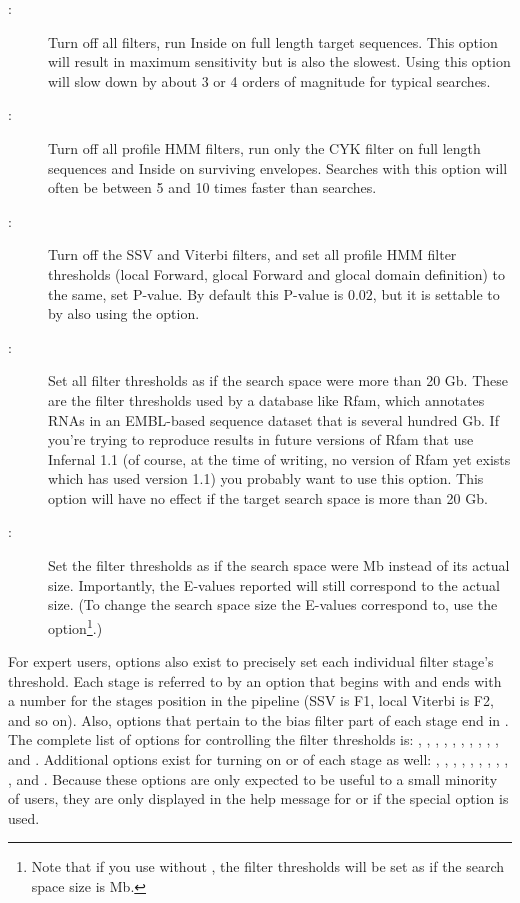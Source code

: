 \begin{description}
\item[:] Turn off all filters, run Inside on full length
  target sequences. This option will result in maximum sensitivity but
  is also the slowest. Using this option will slow down
   by about 3 or 4 orders of magnitude for typical
  searches.
\item[:] Turn off all profile HMM filters, run only the
  CYK filter on full length sequences and Inside on surviving
  envelopes. Searches with this option will often be between 5 and
  10 times faster than  searches.
\item[:] Turn off the SSV and Viterbi filters, and set
  all profile HMM filter thresholds (local Forward, glocal Forward and
  glocal domain definition) to the same, set P-value. By default this
  P-value is $0.02$, but it is settable to  by also using
  the  option. 
\item[:] Set all filter thresholds as if the search
  space were more than 20 Gb. These are the filter thresholds used by
  a database like Rfam, which annotates RNAs in an EMBL-based sequence
  dataset that is several hundred Gb. If you're trying to
  reproduce results in future versions of Rfam that use Infernal 1.1
  (of course, at the time of writing, no version of Rfam yet exists
  which has used version 1.1) you probably want to use this option.
  This option will have no effect if the target search space is more
  than 20 Gb. 
\item[:] Set the filter thresholds as if the search space
  were  Mb instead of its actual size. Importantly, the E-values
  reported will still correspond to the actual size. (To change the
  search space size the E-values correspond to, use the 
  option\footnote{Note that if you use  without
  , the filter thresholds will be set as if the
  search space size is  Mb.}.)
\end{description}

For expert users, options also exist to precisely set each individual
filter stage's threshold. Each stage is referred to by an option that
begins with  and ends with a number for the stages position
in the pipeline (SSV is F1, local Viterbi is F2, and so on). Also,
options that pertain to the bias filter part of each stage end in
. The complete list of options for controlling the filter
thresholds is: , , ,
, , , ,
, , , and
. Additional options exist for turning on or of each stage
as well: , , ,
, , , ,
, , , and .
Because these options are only expected to be useful to a small
minority of users, they are only displayed in the help message for
 or  if the special 
option is used.

